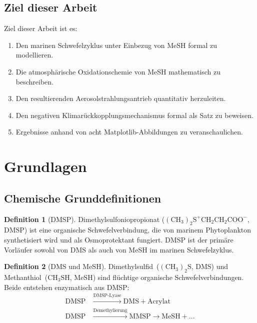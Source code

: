 ﻿\documentclass[a4paper,12pt]{article}
\theoremstyle{definition}
\newtheorem{definition}{Definition}
\begin{document}
\subsection{Ziel dieser Arbeit}

Ziel dieser Arbeit ist es:
\begin{enumerate}
  \item Den marinen Schwefelzyklus unter Einbezug von MeSH formal zu modellieren.
  \item Die atmosphärische Oxidationschemie von MeSH mathematisch zu beschreiben.
  \item Den resultierenden Aerosolstrahlungsantrieb quantitativ herzuleiten.
  \item Den negativen Klimarückkopplungsmechanismus formal als Satz zu beweisen.
  \item Ergebnisse anhand von acht Matplotlib-Abbildungen zu veranschaulichen.
\end{enumerate}

\section{Grundlagen}

\subsection{Chemische Grunddefinitionen}

\begin{definition}[DMSP]
  Dimethylsulfoniopropionat (\(\mathrm{(CH_3)_2S^+CH_2CH_2COO^-}\), DMSP) ist eine organische
  Schwefelverbindung, die von marinem Phytoplankton synthetisiert wird und als Osmoprotektant
  fungiert. DMSP ist der primäre Vorläufer sowohl von DMS als auch von MeSH im marinen
  Schwefelzyklus.
\end{definition}

\begin{definition}[DMS und MeSH]
  Dimethylsulfid~(\(\mathrm{(CH_3)_2S}\), DMS) und Methanthiol~(\(\mathrm{CH_3SH}\), MeSH) sind
  flüchtige organische Schwefelverbindungen. Beide entstehen enzymatisch aus DMSP:
  \begin{align}
    \mathrm{DMSP} &\xrightarrow{\text{DMSP-Lyase}} \mathrm{DMS} + \mathrm{Acrylat} \label{eq:dms_formation}\\
    \mathrm{DMSP} &\xrightarrow{\text{Demethylierung}} \mathrm{MMSP} \xrightarrow{} \mathrm{MeSH} + \ldots \label{eq:mesh_formation}
  \end{align}
\end{definition}
\end{document}
